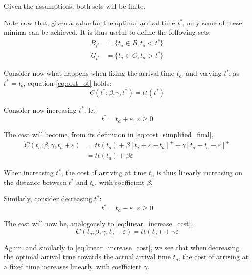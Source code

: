 Given the assumptions, both sets will be finite.

Note now that, given a value for the optimal arrival time \(t^*\),
only some of these minima can be achieved.
It is thus useful to define the following sets:
\begin{align*}
  B_{t^*} & = \{t_a \in B, t_a < t^*\} \\
  G_{t^*} & = \{t_a \in G, t_a > t^*\}
\end{align*}


Consider now what happens when fixing the arrival time \(t_a\),
and varying \(t^*\):
as \(t^* = t_a\), equation \eqref{eq:cost_ot} holds:
\begin{equation*}
  C(t^*; \beta, \gamma, t^*) = tt(t^*)
\end{equation*}

Consider now increasing \(t^*\):
let
\[t^* = t_a + \varepsilon,\ \varepsilon \geq 0\]

The cost will become, from its definition in \eqref{eq:cost_simplified_final},
\begin{align*}
  C(t_a; \beta, \gamma, t_a+\varepsilon) & = tt(t_a) + \beta [t_a + \varepsilon - t_a]^+ + \gamma [t_a - t_a - \varepsilon]^+ \\
  & = tt(t_a) + \beta\varepsilon \tag{\theequation}\label{eq:linear_increase_cost}
\end{align*}

When increasing \(t^*\), the cost of arriving at time \(t_a\) is thus linearly increasing on the distance between \(t^*\) and \(t_a\),
with coefficient \(\beta\).

Similarly, consider decreasing \(t^*\):
\[t^* = t_a - \varepsilon,\ \varepsilon \geq 0\]

The cost will now be, analogously to \eqref{eq:linear_increase_cost},
\begin{equation}
  \label{eq:linear_increase_cost}
  C(t_a; \beta, \gamma, t_a - \varepsilon) = tt(t_a) + \gamma\varepsilon
\end{equation}

Again, and similarly to \eqref{eq:linear_increase_cost},
we see that when decreasing the optimal arrival time towards the actual arrival time \(t_a\),
the cost of arriving at a fixed time increases linearly,
with coefficient \(\gamma\).

